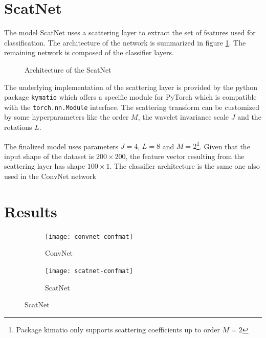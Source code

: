 \documentclass[11pt,a4paper]{article}
\begin{document}
\section{ScatNet}

The model ScatNet uses a scattering layer to extract the set of features used for classification. The architecture of the network is summarized in figure \ref{fig:scatnet:structure}. The remaining network is composed of the classifier layers.

\begin{figure}\label{fig:scatnet:structure}
    \caption{Architecture of the ScatNet}
    
\end{figure}

The underlying implementation of the scattering layer is provided by the python package \verb|kymatio|\cite{JMLR:v21:19-047} which offers a specific module for PyTorch which is compatible with the \verb|torch.nn.Module| interface. The scattering transform can be customized by some hyperparameters like the order $M$, the wavelet invariance scale $J$ and the rotations $L$.

The finalized model uses parameters $J=4$, $L=8$ and $M=2$\footnote{Package kimatio only supports scattering coefficients up to order $M=2$}. Given that the input shape of the dataset is $200 \times 200$, the feature vector resulting from the scattering layer has shape $100 \times 1$. The classifier architecture is the same one also used in the ConvNet network



\section{Results}

\begin{figure}[h]
    \label{fig:scatnet:confmat}
    \caption{Comparison of the resulting confusion matrices}
    
    \begin{subfigure}{0.5\textwidth}
        \texttt{[image: convnet-confmat]}
        \caption{ConvNet}
    \end{subfigure}
    \hfill
    \begin{subfigure}{0.5\textwidth}
        \texttt{[image: scatnet-confmat]}
        \caption{ScatNet}
    \end{subfigure}
\end{figure}
\end{document}
